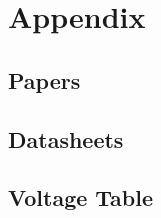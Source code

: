 \appendix
	
\section{Appendix}
	\subsection{Papers}
	
	
	
	\subsection{Datasheets} \label{sec:appendix}
	

	\subsection{Voltage Table} \label{VoltageSet}
	
